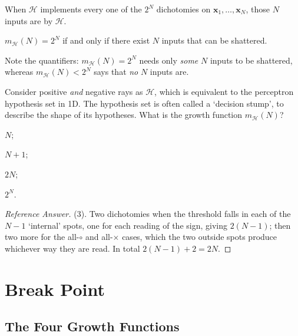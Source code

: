 \begin{definition}[Shattering]\label{def:shatter}
    When \(\mathcal{H}\) implements every one of the \(2^N\) dichotomies on
    \(\bm{x}_1, \dots , \bm{x}_N\), those \(N\) inputs are  by
    \(\mathcal{H}\).
\end{definition}

\begin{moral}
    \(m_{\mathcal{H}}(N) = 2^N\) if and only if there exist \(N\) inputs that
    can be shattered.
\end{moral}

Note the quantifiers: \(m_{\mathcal{H}}(N) = 2^N\) needs only \emph{some}
\(N\) inputs to be shattered, whereas \(m_{\mathcal{H}}(N) < 2^N\) says that
\emph{no} \(N\) inputs are.

\begin{exercise}
    Consider positive \emph{and} negative rays as \(\mathcal{H}\), which is
    equivalent to the perceptron hypothesis set in 1D. The hypothesis set is
    often called a `decision stump', to describe the shape of its hypotheses.
    What is the growth function \(m_{\mathcal{H}}(N)\)?
    \begin{enumerate*}[(1)]
        \item \(N\); \item \(N + 1\); \item \(2N\); \item \(2^N\).
    \end{enumerate*}
\end{exercise}

\begin{proof}[Reference Answer]
    (3). Two dichotomies when the threshold falls in each of the \(N - 1\)
    `internal' spots, one for each reading of the sign, giving \(2(N-1)\); then
    two more for the all-\(\circ\) and all-\(\times\) cases, which the two
    outside spots produce whichever way they are read. In total
    \(2(N-1) + 2 = 2N\).
\end{proof}

\section{Break Point}\label{sec:break-point}


\subsection{The Four Growth Functions}

